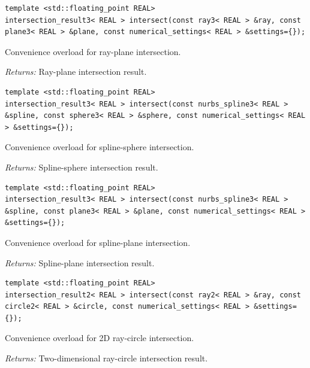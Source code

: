 \par\noindent\begin{minipage}{\linewidth}
\begin{lstlisting}[style=apireference]
template <std::floating_point REAL>
intersection_result3< REAL > intersect(const ray3< REAL > &ray, const plane3< REAL > &plane, const numerical_settings< REAL > &settings={});
\end{lstlisting}
{\footnotesize Convenience overload for ray-plane intersection.\par}
{\footnotesize\textit{Returns:} Ray-plane intersection result.\par}
\end{minipage}\par\vspace{1pt}
\par\noindent\begin{minipage}{\linewidth}
\begin{lstlisting}[style=apireference]
template <std::floating_point REAL>
intersection_result3< REAL > intersect(const nurbs_spline3< REAL > &spline, const sphere3< REAL > &sphere, const numerical_settings< REAL > &settings={});
\end{lstlisting}
{\footnotesize Convenience overload for spline-sphere intersection.\par}
{\footnotesize\textit{Returns:} Spline-sphere intersection result.\par}
\end{minipage}\par\vspace{1pt}
\par\noindent\begin{minipage}{\linewidth}
\begin{lstlisting}[style=apireference]
template <std::floating_point REAL>
intersection_result3< REAL > intersect(const nurbs_spline3< REAL > &spline, const plane3< REAL > &plane, const numerical_settings< REAL > &settings={});
\end{lstlisting}
{\footnotesize Convenience overload for spline-plane intersection.\par}
{\footnotesize\textit{Returns:} Spline-plane intersection result.\par}
\end{minipage}\par\vspace{1pt}
\par\noindent\begin{minipage}{\linewidth}
\begin{lstlisting}[style=apireference]
template <std::floating_point REAL>
intersection_result2< REAL > intersect(const ray2< REAL > &ray, const circle2< REAL > &circle, const numerical_settings< REAL > &settings={});
\end{lstlisting}
{\footnotesize Convenience overload for 2D ray-circle intersection.\par}
{\footnotesize\textit{Returns:} Two-dimensional ray-circle intersection result.\par}
\end{minipage}\par\vspace{1pt}
